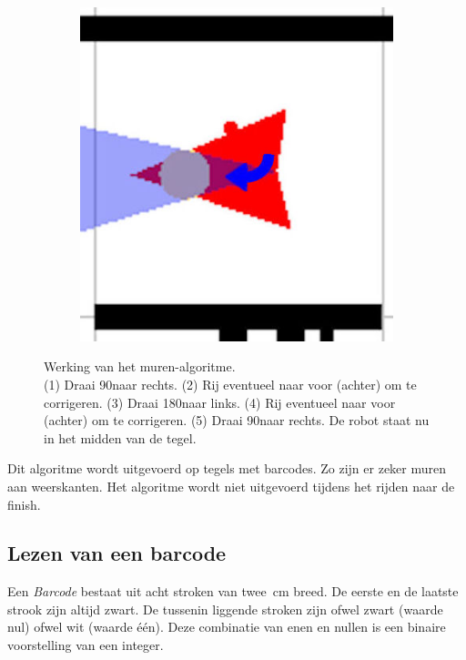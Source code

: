 \documentclass[t1]{penoverslag}
\begin{document}
\begin{figure}
\begin{subfigure}[hb]{0.2\textwidth}
        \end{subfigure}%
        \begin{subfigure}[hb]{0.2\textwidth}
                \centering
                \includegraphics[width=\textwidth]{muur6}
        \end{subfigure}
 \caption[Werking van het muren-algoritme.]{Werking van het muren-algoritme.\\(1) Draai 90\degree naar rechts. (2) Rij eventueel naar voor (achter) om te corrigeren. (3) Draai 180\degree naar links. (4) Rij eventueel naar voor (achter) om te corrigeren. (5) Draai 90\degree naar rechts. De robot staat nu in het midden van de tegel.}
\label{fig:algoMuur}
\end{figure}

Dit algoritme wordt uitgevoerd op tegels met barcodes. Zo zijn er zeker muren aan weerskanten. Het algoritme wordt niet uitgevoerd tijdens het rijden naar de finish.

\subsection{Lezen van een barcode} %
\label{ssec:algoBarcode}
Een \textit{Barcode} bestaat uit acht stroken van twee~cm breed. De eerste en de laatste strook zijn altijd zwart. De tussenin liggende stroken zijn ofwel zwart (waarde nul) ofwel wit (waarde \'e\'en). Deze combinatie van enen en nullen is een binaire voorstelling van een integer.
\end{document}
